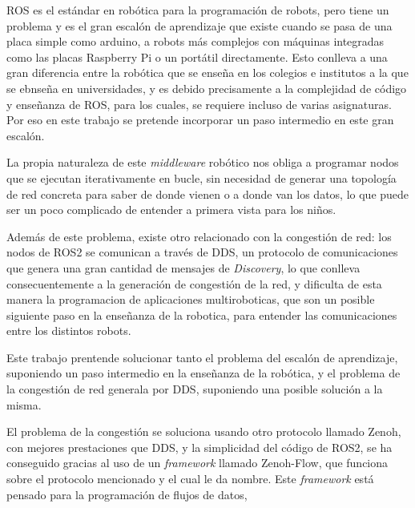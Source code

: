 ROS es el estándar en robótica para la programación de robots, pero tiene un
problema y es el gran escalón de aprendizaje que existe cuando se pasa de una
placa simple como arduino, a robots más complejos con máquinas integradas como
las placas Raspberry Pi o un portátil directamente. Esto conlleva a una gran
diferencia entre la robótica que se enseña en los colegios e institutos a la que
se ebnseña en universidades, y es debido precisamente a la complejidad de código
y enseñanza de ROS, para los cuales, se requiere incluso de varias asignaturas.
Por eso en este trabajo se pretende incorporar un paso intermedio en este gran
escalón.

La propia naturaleza de este \textit{middleware} robótico nos obliga a programar
nodos que se ejecutan iterativamente en bucle, sin necesidad de generar una
topología de red concreta para saber de donde vienen o a donde van los datos, lo
que puede ser un poco complicado de entender a primera vista para los niños.

Además de este problema, existe otro relacionado con la congestión de red: los
nodos de ROS2 se comunican a través de DDS, un protocolo de comunicaciones que
genera una gran cantidad de mensajes de \textit{Discovery}, lo que conlleva
consecuentemente a la generación de congestión de la red, y dificulta de esta
manera la programacion de aplicaciones multiroboticas, que son un posible
siguiente paso en la enseñanza de la robotica, para entender las comunicaciones
entre los distintos robots.

Este trabajo prentende solucionar tanto el problema del escalón de aprendizaje,
suponiendo un paso intermedio en la enseñanza de la robótica, y el problema de
la congestión de red generala por DDS, suponiendo una posible solución a la
misma.

El problema de la congestión se soluciona usando otro protocolo llamado Zenoh,
con mejores prestaciones que DDS, y la simplicidad del código de ROS2, se ha
conseguido gracias al uso de un \textit{framework} llamado Zenoh-Flow, que
funciona sobre el protocolo mencionado y el cual le da nombre. Este
\textit{framework} está pensado para la programación de flujos de datos,

